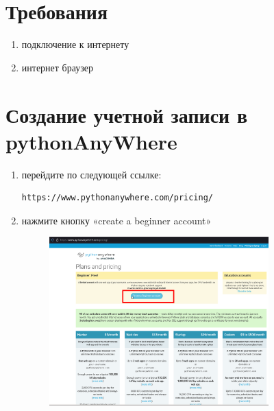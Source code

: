 \documentclass[12pt]{article}
\begin{document}
\tableofcontents
\newpage
\setcounter{page}{1}%
\section{Требования}
\begin{enumerate}
	\item подключение к интернету
  \item интернет браузер
\end{enumerate}

\section{Создание учетной записи в pythonAnyWhere}
	\begin{enumerate}
    \item перейдите по следующей ссылке:
      \begin{lstlisting}[caption=\phantom{},style=conlst,label={lst:enter_desktop}]
      https://www.pythonanywhere.com/pricing/
			\end{lstlisting}

    \item нажмите кнопку «create a beginner account»
	\begin{figure}[H]
		\centering
		\includegraphics[width=0.8\textwidth ,keepaspectratio]{imgs/create_beginner_account.png}
		\caption{}
	\end{figure}


\end{enumerate}
\end{document}
